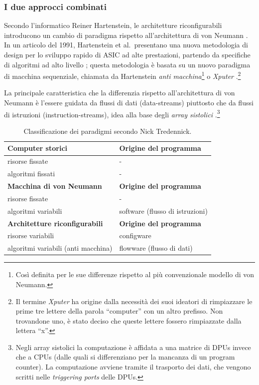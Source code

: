 \subsubsection{I due approcci combinati}
Secondo l'informatico Reiner Hartenstein, le architetture riconfigurabili introducono un
cambio di paradigma rispetto all'architettura di von Neumann
\cite{HartensteinParadigmShift}. In un articolo del 1991, Hartenstein et al.~presentano
una nuova metodologia di design per lo sviluppo rapido di \ac{ASIC} ad alte prestazioni,
partendo da specifiche di algoritmi ad alto livello \cite{HartensteinNovelASICDesign};
questa metodologia è basata su un nuovo paradigma di macchina sequenziale, chiamata da
Hartenstein \emph{anti macchina}\footnote{Così definita per le sue differenze rispetto al
più convenzionale modello di von Neumann.} o \emph{Xputer} \cite{HartensteinNovelASICDesign}.\footnote{Il termine
\emph{Xputer} ha origine dalla necessità dei suoi ideatori di rimpiazzare le prime tre
lettere della parola ``computer'' con un altro prefisso. Non trovandone uno, è stato
deciso che queste lettere fossero rimpiazzate dalla lettera ``x''.}

La principale caratteristica che la differenzia rispetto all'architettura di von Neumann è
l'essere guidata da flussi di dati (data-streams) piuttosto che da flussi di istruzioni
(instruction-streams), idea alla base degli \emph{array sistolici}
\cite{SystolicArraysConceptImplementation}.\footnote{Negli array
sistolici la computazione è affidata a una matrice di \acp{DPU} invece che a \acsp{CPU}
(dalle quali si differenziano per la mancanza di un program counter). La computazione
avviene tramite il trasporto dei dati, che vengono scritti nelle \emph{triggering ports}
delle \acp{DPU}.}



\begin{table}[ht]
\begin{center}
 \begin{tabular}{l | l}
 \hline
 \textbf{Computer storici} & \textbf{Origine del programma}\\
 \hline
 risorse fissate & -\\
 algoritmi fissati & -\\
 \hline
 \textbf{Macchina di von Neumann} & \textbf{Origine del programma}\\
 \hline
 risorse fissate & -\\
 algoritmi variabili & software (flusso di istruzioni)\\
 \hline
 \textbf{Architetture riconfigurabili} & \textbf{Origine del programma}\\
 \hline
 risorse variabili & configware\\
 algoritmi variabili (anti macchina) & flowware (flusso di dati)
 \end{tabular}
 \caption{Classificazione dei paradigmi secondo Nick Tredennick.}
 \label{tab:TredennickClassificationScheme}
 \end{center}
\end{table}

